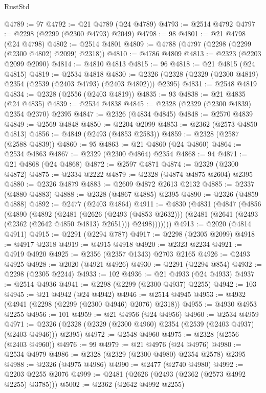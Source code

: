 \begin{lexlean}{RustStd}
\begin{coremodule}
@4789 := 97
@4792 := @21 @4789 (@24 @4789)
@4793 := @2514 @4792
@4797 := @2298 (@2299 (@2300 @4793) @2049)
@4798 := 98
@4801 := @21 @4798 (@24 @4798)
@4802 := @2514 @4801
@4809 := @4788 (@4797 (@2298 (@2299 (@2300 @4802) @2099) @2318))
@4810 := @4786 @4809
@4813 := @2323 (@2203 @2099 @2090)
@4814 := @4810 @4813
@4815 := 96
@4818 := @21 @4815 (@24 @4815)
@4819 := @2534 @4818
@4830 := @2326 (@2328 (@2329 (@2300 @4819) @2354 (@2539 (@2403 @4793) (@2403 @4802))) @2395)
@4831 := @2548 @4819
@4834 := @2328 (@2556 (@2403 @4819))
@4835 := 93
@4838 := @21 @4835 (@24 @4835)
@4839 := @2534 @4838
@4845 := @2328 (@2329 (@2300 @4839) @2354 @2370) @2395
@4847 := @2326 (@4834 @4845)
@4848 := @2570 @4839
@4849 := @2569 @4848
@4850 := @2204 @2099
@4853 := @2362 (@2573 @4850 @4813)
@4856 := @4849 (@2493 (@4853 @2583))
@4859 := @2328 (@2587 (@2588 @4839))
@4860 := 95
@4863 := @21 @4860 (@24 @4860)
@4864 := @2534 @4863
@4867 := @2329 (@2300 @4864) @2354
@4868 := 94
@4871 := @21 @4868 (@24 @4868)
@4872 := @2597 @4871
@4874 := @2329 (@2300 @4872)
@4875 := @2334 @2222
@4879 := @2328 (@4874 @4875 @2604) @2395
@4880 := @2326 @4879
@4883 := @2609 @4872 @2613 @2132
@4885 := @2337 (@4880 @4883)
@4888 := @2328 (@4867 @4885) @2395
@4890 := @2326 (@4859 @4888)
@4892 := @2477 (@2403 @4864)
@4911 := @4830
    (@4831
      (@4847
        (@4856
          (@4890
            (@4892
              (@2481
                (@2626 (@2493 (@4853 @2632)))
                (@2481 (@2641 (@2493 (@2362 (@2642 @4850 @4813) @2651))) @2498)))))))
@4913 := @2020 (@4814 @4911)
@4915 := @2291 (@2294 @787)
@4917 := @2298 (@2305 @2099)
@4918 := @4917 @2318
@4919 := @4915 @4918
@4920 := @2323 @2234
@4921 := @4919 @4920
@4925 := @2356 (@2357 @1343) @2703 @2165
@4926 := @2493 @4925
@4928 := @2020 (@4921 @4926)
@4930 := @2291 (@2294 @854)
@4932 := @2298 (@2305 @2244)
@4933 := 102
@4936 := @21 @4933 (@24 @4933)
@4937 := @2514 @4936
@4941 := @2298 (@2299 (@2300 @4937) @2255)
@4942 := 103
@4945 := @21 @4942 (@24 @4942)
@4946 := @2514 @4945
@4953 := @4932 (@4941 (@2298 (@2299 (@2300 @4946) @2076) @2318))
@4955 := @4930 @4953 @2255
@4956 := 101
@4959 := @21 @4956 (@24 @4956)
@4960 := @2534 @4959
@4971 := @2326 (@2328 (@2329 (@2300 @4960) @2354 (@2539 (@2403 @4937) (@2403 @4946))) @2395)
@4972 := @2548 @4960
@4975 := @2328 (@2556 (@2403 @4960))
@4976 := 99
@4979 := @21 @4976 (@24 @4976)
@4980 := @2534 @4979
@4986 := @2328 (@2329 (@2300 @4980) @2354 @2578) @2395
@4988 := @2326 (@4975 @4986)
@4990 := @2477 (@2740 @4980)
@4992 := @2203 @2255 @2076
@4999 := @2481 (@2626 (@2493 (@2362 (@2573 @4992 @2255) @3785)))
@5002 := @2362 (@2642 @4992 @2255)

\end{coremodule}
\end{lexlean}
